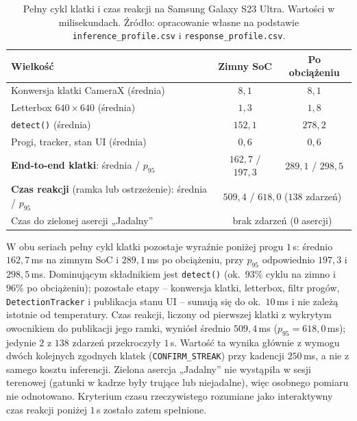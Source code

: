 \begin{table}[htbp]
 \centering
 \caption{Pełny cykl klatki i czas reakcji na Samsung Galaxy S23 Ultra. Wartości w milisekundach. Źródło: opracowanie własne na podstawie \texttt{inference\_profile.csv} i \texttt{response\_profile.csv}.}
 \label{tab:latency_e2e}
 \begin{tabular}{|l|c|c|}
 \hline
 \textbf{Wielkość} & \textbf{Zimny SoC} & \textbf{Po obciążeniu} \\
 \hline \hline
 Konwersja klatki CameraX (średnia) & $8{,}1$ & $8{,}1$ \\
 \hline
 Letterbox $640\times640$ (średnia) & $1{,}3$ & $1{,}8$ \\
 \hline
 \texttt{detect()} (średnia) & $152{,}1$ & $278{,}2$ \\
 \hline
 Progi, tracker, stan UI (średnia) & $0{,}6$ & $0{,}6$ \\
 \hline
 \textbf{End-to-end klatki}: średnia / $p_{95}$ & $162{,}7$ / $197{,}3$ & $289{,}1$ / $298{,}5$ \\
 \hline \hline
 \textbf{Czas reakcji} (ramka lub ostrzeżenie): średnia / $p_{95}$ & \multicolumn{2}{c|}{$509{,}4$ / $618{,}0$ ($138$ zdarzeń)} \\
 \hline
 Czas do zielonej asercji „Jadalny” & \multicolumn{2}{c|}{brak zdarzeń ($0$ asercji)} \\
 \hline
 \end{tabular}
\end{table}

W obu seriach pełny cykl klatki pozostaje wyraźnie poniżej progu $1$\,s: średnio $162{,}7$\,ms na zimnym SoC i $289{,}1$\,ms po obciążeniu, przy $p_{95}$ odpowiednio $197{,}3$ i $298{,}5$\,ms. Dominującym składnikiem jest \texttt{detect()} (ok.\ $93\%$ cyklu na zimno i $96\%$ po obciążeniu); pozostałe etapy -- konwersja klatki, letterbox, filtr progów, \texttt{DetectionTracker} i publikacja stanu UI -- sumują się do ok.\ $10$\,ms i nie zależą istotnie od temperatury. Czas reakcji, liczony od pierwszej klatki z wykrytym owocnikiem do publikacji jego ramki, wyniósł średnio $509{,}4$\,ms ($p_{95}=618{,}0$\,ms); jedynie $2$ z $138$ zdarzeń przekroczyły $1$\,s. Wartość ta wynika głównie z wymogu dwóch kolejnych zgodnych klatek (\texttt{CONFIRM\_STREAK}) przy kadencji $250$\,ms, a nie z samego kosztu inferencji. Zielona asercja „Jadalny” nie wystąpiła w sesji terenowej (gatunki w kadrze były trujące lub niejadalne), więc osobnego pomiaru nie odnotowano. Kryterium czasu rzeczywistego rozumiane jako interaktywny czas reakcji poniżej $1$\,s zostało zatem spełnione.

